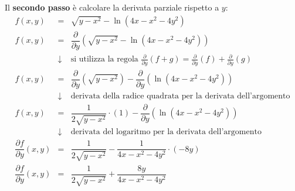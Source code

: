 \documentclass[a4paper]{article}
\begin{document}
	\noindent
	Il \textbf{secondo passo} è calcolare la derivata parziale rispetto a $y$:
	\begin{equation*}
		\begin{array}{rcl}
			f\left(x,y\right) &=& \sqrt{y-x^{2}}-\ln\left(4x-x^{2}-4y^{2}\right) \\ [1em]
			f\left(x,y\right) &=& \dfrac{\partial}{\partial y}\left( \sqrt{y-x^{2}}-\ln\left(4x-x^{2}-4y^{2}\right) \right) \\ [1.5em]
			&\downarrow& \text{si utilizza la regola } \frac{\partial}{\partial y}\left(f+g\right) = \frac{\partial}{\partial y}\left(f\right) + \frac{\partial}{\partial y}\left(g\right) \\ [1em]
			f\left(x,y\right) &=& \dfrac{\partial}{\partial y}\left( \sqrt{y-x^{2}}\right) - \dfrac{\partial}{\partial y}\left(\ln\left(4x-x^{2}-4y^{2}\right) \right) \\ [1.5em]
			&\downarrow& \text{derivata della radice quadrata per la derivata dell'argomento} \\ [1em]
			f\left(x,y\right) &=& \dfrac{1}{2\sqrt{y-x^{2}}}\cdot\left(1\right) - \dfrac{\partial}{\partial y}\left(\ln\left(4x-x^{2}-4y^{2}\right) \right) \\ [1.5em]
			&\downarrow& \text{derivata del logaritmo per la derivata dell'argomento} \\ [1em]
			\dfrac{\partial f}{\partial y} \left(x,y\right) &=& \dfrac{1}{2\sqrt{y-x^{2}}} - \dfrac{1}{4x-x^{2}-4y^{2}}\cdot\left(-8y\right) \\ [1.5em]
			\dfrac{\partial f}{\partial y} \left(x,y\right) &=& \dfrac{1}{2\sqrt{y-x^{2}}} + \dfrac{8y}{4x-x^{2}-4y^{2}}
		\end{array}
	\end{equation*}\newpage
\end{document}

